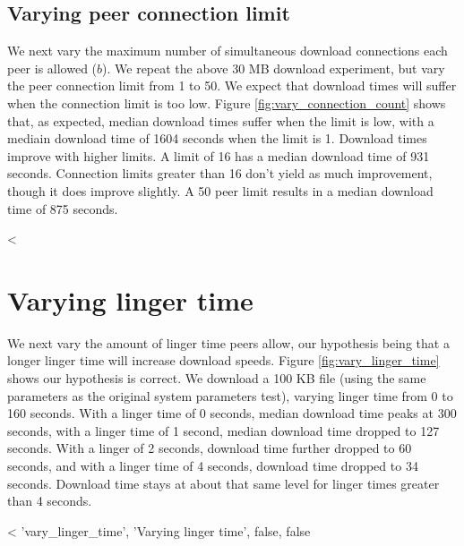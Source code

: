 \subsection{Varying peer connection limit} 

We next vary the maximum number of simultaneous download connections each peer is allowed ($b$). We 
repeat the above 30 MB download experiment, but vary the peer connection limit from 1 to 50. 
We expect that download times will suffer when the connection limit is too low. Figure \ref{fig:vary_connection_count} shows that, as expected, median 
download times suffer when the limit is low, with a mediain download time of 1604 seconds when the limit is 1.  Download 
times improve with higher limits.  A limit of 16 has a median download time of 931 seconds.  Connection limits greater than 16 don't
yield as much improvement, though it does improve slightly.  A 50 peer limit results in a median download time of 875 seconds.

<%

\section{Varying linger time}

We next vary the amount of linger time peers allow, our hypothesis being that a longer linger 
time will increase download speeds.  Figure \ref{fig:vary_linger_time} shows our hypothesis is correct.   
We download a 100 KB file (using the same parameters as the original system parameters test), varying linger time from 0 to 160 seconds.
With a linger time of 0 seconds, median download time peaks at 300 seconds, with 
a linger time of 1 second, median download time dropped to 127 seconds.  With a linger of 2 seconds, download time further dropped to 60 seconds, and
with a linger time of 4 seconds, download time dropped to 34 seconds.  Download time stays at about that same level for linger times greater than 4 seconds.

<%
 'vary_linger_time', 'Varying linger time', false, false %